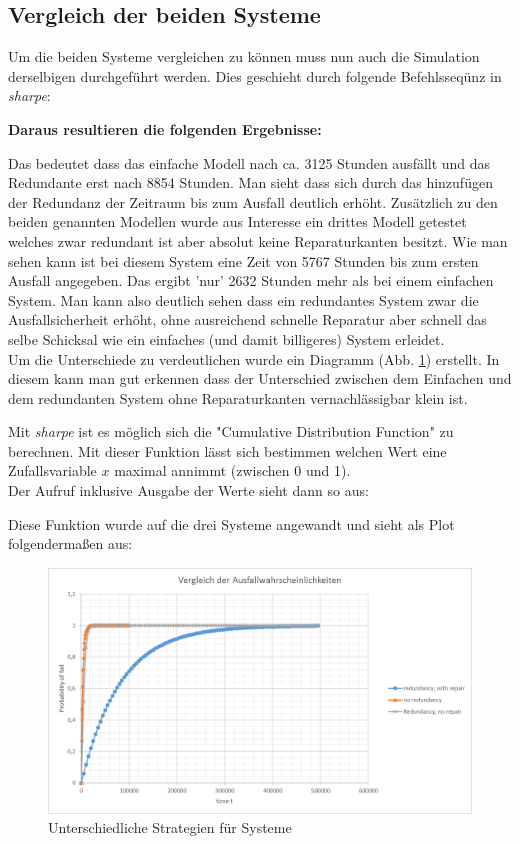 \documentclass[10pt,a4paper]{article}
\begin{document}
\subsection{Vergleich der beiden Systeme}
\label{subsec:mttf_res}
Um die beiden Systeme vergleichen zu können muss nun auch die Simulation derselbigen durchgeführt werden. Dies geschieht durch folgende Befehlsseqünz in \textit{sharpe}:


\textbf{Daraus resultieren die folgenden Ergebnisse:} 

Das bedeutet dass das einfache Modell nach ca. 3125 Stunden ausfällt und das Redundante erst nach 8854 Stunden. Man sieht dass sich durch das hinzufügen der Redundanz der Zeitraum bis zum Ausfall deutlich erhöht.
Zusätzlich zu den beiden genannten Modellen wurde aus Interesse ein drittes Modell getestet welches
zwar redundant ist aber absolut keine Reparaturkanten besitzt. Wie man sehen kann ist bei diesem System eine Zeit von 5767 Stunden bis zum ersten Ausfall angegeben. 
Das ergibt 'nur' 2632 Stunden mehr als bei einem einfachen System. Man kann also deutlich sehen dass ein redundantes System zwar die Ausfallsicherheit erhöht, ohne ausreichend schnelle Reparatur aber
schnell das selbe Schicksal wie ein einfaches (und damit billigeres) System erleidet.
\\
Um die Unterschiede zu verdeutlichen wurde ein Diagramm (Abb. \ref{fail_plot}) erstellt. In diesem kann man gut erkennen dass der Unterschied zwischen dem Einfachen und dem redundanten System ohne Reparaturkanten vernachlässigbar klein ist.

Mit \textit{sharpe} ist es möglich sich die "Cumulative Distribution Function" zu berechnen.
Mit dieser Funktion lässt sich bestimmen welchen Wert eine Zufallsvariable $x$ maximal annimmt (zwischen 0 und 1). \\
Der Aufruf inklusive Ausgabe der Werte sieht dann so aus:

Diese Funktion wurde auf die drei Systeme angewandt und sieht als Plot folgendermaßen aus:

\begin{figure}[ht!]
\centering
\includegraphics[width=140mm]{Ausfallwahrscheinlichkeit_Plot.png}
\caption{Unterschiedliche Strategien für Systeme \label{fail_plot}}
\end{figure}
\end{document}
